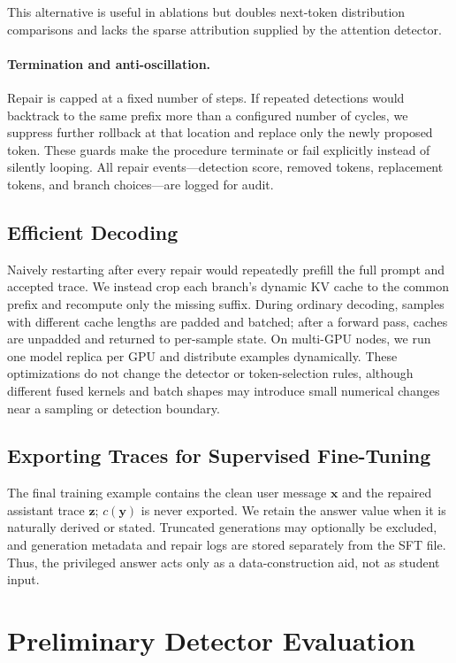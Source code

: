 \documentclass[11pt]{article}
\newcommand{\bx}{\mathbf{x}}
\newcommand{\by}{\mathbf{y}}
\newcommand{\bz}{\mathbf{z}}
\begin{document}
This alternative is useful in ablations but doubles next-token distribution
comparisons and lacks the sparse attribution supplied by the attention detector.

\paragraph{Termination and anti-oscillation.}
Repair is capped at a fixed number of steps.  If repeated detections would
backtrack to the same prefix more than a configured number of cycles, we
suppress further rollback at that location and replace only the newly proposed
token.  These guards make the procedure terminate or fail explicitly instead
of silently looping.  All repair events---detection score, removed tokens,
replacement tokens, and branch choices---are logged for audit.

\subsection{Efficient Decoding}

Naively restarting after every repair would repeatedly prefill the full prompt
and accepted trace.  We instead crop each branch's dynamic KV cache to the
common prefix and recompute only the missing suffix.  During ordinary decoding,
samples with different cache lengths are padded and batched; after a forward
pass, caches are unpadded and returned to per-sample state.  On multi-GPU nodes,
we run one model replica per GPU and distribute examples dynamically.  These
optimizations do not change the detector or token-selection rules, although
different fused kernels and batch shapes may introduce small numerical changes
near a sampling or detection boundary.

\subsection{Exporting Traces for Supervised Fine-Tuning}

The final training example contains the clean user message $\bx$ and the repaired
assistant trace $\bz$; $c(\by)$ is never exported.  We retain the answer value
when it is naturally derived or stated.  Truncated generations may optionally
be excluded, and generation metadata and repair logs are stored separately from
the SFT file.  Thus, the privileged answer acts only as a data-construction aid,
not as student input.

\section{Preliminary Detector Evaluation}
\label{sec:prelim}
\end{document}
